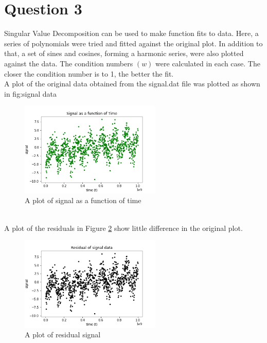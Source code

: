 \documentclass[11pt]{article}
\begin{document}
\section{Question 3}

Singular Value Decomposition can be used to make function fits to data. Here, a series of polynomials were tried and fitted against the original plot. In addition to that, a set of sines and cosines, forming a harmonic series, were also plotted against the data. The condition numbers $(w)$ were calculated in each case. The closer the condition number is to 1, the better the fit. 
\\
A plot of the original data obtained from the signal.dat file was plotted as shown in  \figurename{fig:signal data}
\begin{figure}[htp]\begin{center} 
		\vspace{12pt}
		\includegraphics[width=0.6\textwidth]{signal data plot.png}
		\caption{A plot of signal as a function of time}
		\label{fig:signal data} 
	\end{center}
\end{figure} 
\\
A plot of the residuals in Figure \ref{fig:residual} show little difference in the original plot.
\begin{figure}[htp]\begin{center} 
		\vspace{12pt}
		\includegraphics[width=0.6\textwidth]{residual.png}
		\caption{A plot of residual signal}
		\label{fig:residual} 
	\end{center}
\end{figure} 
\end{document}
